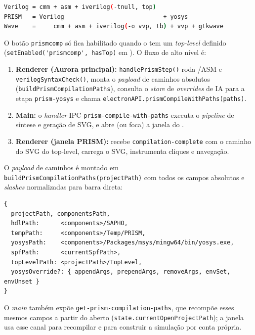 \begin{lstlisting}[language=bash,caption={Expansão dos botões (cabeçalho de compilation\_flow.js)}]
Verilog = cmm + asm + iverilog(-tnull, top)
PRISM   = Verilog                            + yosys
Wave    =     cmm + asm + iverilog(-o vvp, tb) + vvp + gtkwave
\end{lstlisting}

O botão \lstinline|prismcomp| só fica habilitado quando o  tem um
\emph{top-level} definido (\lstinline|setEnabled('prismcomp', hasTop)| em
). O fluxo de alto nível é:

\begin{enumerate}[leftmargin=2.2em]
  \item \textbf{Renderer (Aurora principal):} \lstinline|handlePrismStep()| roda
        \cmm{}/ASM e \lstinline|verilogSyntaxCheck()|, monta o \emph{payload} de
        caminhos absolutos (\lstinline|buildPrismCompilationPaths|), consulta o
        \emph{store} de \emph{overrides} de IA para a etapa
        \lstinline|prism-yosys| e chama \lstinline|electronAPI.prismCompileWithPaths(paths)|.
  \item \textbf{Main:} o \emph{handler} IPC \lstinline|prism-compile-with-paths|
        executa o \emph{pipeline} de síntese e geração de SVG, e abre (ou foca) a
        janela do .
  \item \textbf{Renderer (janela PRISM):} recebe \lstinline|compilation-complete|
        com o caminho do SVG do top-level, carrega o SVG, instrumenta cliques e
        navegação.
\end{enumerate}

O \emph{payload} de caminhos é montado em
\lstinline|buildPrismCompilationPaths(projectPath)| com todos os campos
absolutos e \emph{slashes} normalizadas para barra direta:

\begin{lstlisting}[caption={Campos do payload de caminhos (compilation\_flow.js)}]
{
  projectPath, componentsPath,
  hdlPath:      <components>/SAPHO,
  tempPath:     <components>/Temp/PRISM,
  yosysPath:    <components>/Packages/msys/mingw64/bin/yosys.exe,
  spfPath:      <currentSpfPath>,
  topLevelPath: <projectPath>/TopLevel,
  yosysOverride?: { appendArgs, prependArgs, removeArgs, envSet, envUnset }
}
\end{lstlisting}

O \emph{main} também expõe \lstinline|get-prism-compilation-paths|, que recompõe
esses mesmos campos a partir do  aberto
(\lstinline|state.currentOpenProjectPath|); a janela usa esse canal para
recompilar e para construir a simulação  por conta própria.

